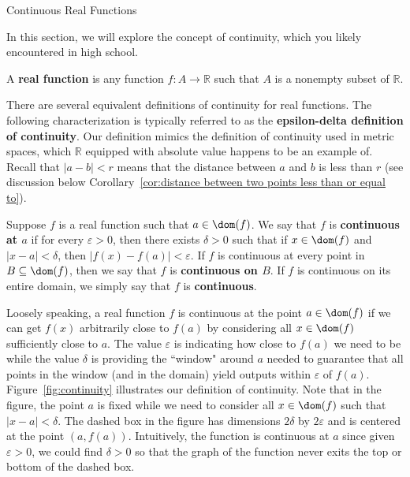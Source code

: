 \begin{section}{Continuous Real Functions}\label{sec:Continuity}

In this section, we will explore the concept of continuity, which you likely encountered in high school.

\begin{definition}
A \textbf{real function} is any function $f:A\to \mathbb{R}$ such that $A$ is a nonempty subset of $\mathbb{R}$. 
\end{definition}

There are several equivalent definitions of continuity for real functions.  The following characterization is typically referred to as the \textbf{epsilon-delta definition of continuity}. Our definition mimics the definition of continuity used in metric spaces, which $\mathbb{R}$ equipped with absolute value happens to be an example of.  Recall that $|a-b|<r$ means that the distance between $a$ and $b$ is less than $r$ (see discussion below Corollary~\ref{cor:distance between two points less than or equal to}).

\begin{definition}\label{def:continuity}
Suppose $f$ is a real function such that $a\in \dom(f)$. We say that $f$ is \textbf{continuous at $a$} if for every $\varepsilon>0$, then there exists $\delta>0$ such that if $x\in\dom(f)$ and $|x-a|<\delta$, then $|f(x)-f(a)|<\varepsilon$. If $f$ is continuous at every point in $B\subseteq\dom(f)$, then we say that $f$ is \textbf{continuous on $B$}. If $f$ is continuous on its entire domain, we simply say that $f$ is \textbf{continuous}.
\end{definition}


Loosely speaking, a real function $f$ is continuous at the point $a\in\dom(f)$ if we can get $f(x)$ arbitrarily close to $f(a)$ by considering all $x\in\dom(f)$ sufficiently close to $a$.  The value $\varepsilon$ is indicating how close to $f(a)$ we need to be while the value $\delta$ is providing the ``window" around $a$ needed to guarantee that all points in the window (and in the domain) yield outputs within $\varepsilon$ of $f(a)$. Figure~\ref{fig:continuity} illustrates our definition of continuity. Note that in the figure, the point $a$ is fixed while we need to consider all $x\in\dom(f)$ such that $|x-a|<\delta$. The dashed box in the figure has dimensions $2\delta$ by $2\varepsilon$ and is centered at the point $(a,f(a))$.  Intuitively, the function is continuous at $a$ since given $\varepsilon>0$, we could find $\delta >0$ so that the graph of the function never exits the top or bottom of the dashed box.


\end{section}
